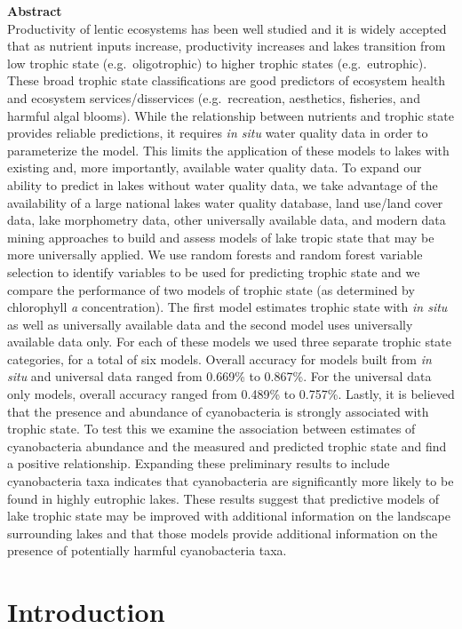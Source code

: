 \documentclass[11pt,]{article}
\begin{document}
\textbf{Abstract}\\Productivity of lentic ecosystems has been well
studied and it is widely accepted that as nutrient inputs increase,
productivity increases and lakes transition from low trophic state
(e.g.~oligotrophic) to higher trophic states (e.g.~eutrophic). These
broad trophic state classifications are good predictors of ecosystem
health and ecosystem services/disservices (e.g.~recreation, aesthetics,
fisheries, and harmful algal blooms). While the relationship between
nutrients and trophic state provides reliable predictions, it requires
\emph{in situ} water quality data in order to parameterize the model.
This limits the application of these models to lakes with existing and,
more importantly, available water quality data. To expand our ability to
predict in lakes without water quality data, we take advantage of the
availability of a large national lakes water quality database, land
use/land cover data, lake morphometry data, other universally available
data, and modern data mining approaches to build and assess models of
lake tropic state that may be more universally applied. We use random
forests and random forest variable selection to identify variables to be
used for predicting trophic state and we compare the performance of two
models of trophic state (as determined by chlorophyll \emph{a}
concentration). The first model estimates trophic state with \emph{in
situ} as well as universally available data and the second model uses
universally available data only. For each of these models we used three
separate trophic state categories, for a total of six models. Overall
accuracy for models built from \emph{in situ} and universal data ranged
from 0.669\% to 0.867\%. For the universal data only models, overall
accuracy ranged from 0.489\% to 0.757\%. Lastly, it is believed that the
presence and abundance of cyanobacteria is strongly associated with
trophic state. To test this we examine the association between estimates
of cyanobacteria abundance and the measured and predicted trophic state
and find a positive relationship. Expanding these preliminary results to
include cyanobacteria taxa indicates that cyanobacteria are
significantly more likely to be found in highly eutrophic lakes. These
results suggest that predictive models of lake trophic state may be
improved with additional information on the landscape surrounding lakes
and that those models provide additional information on the presence of
potentially harmful cyanobacteria taxa.

\section{Introduction}\label{introduction}
\end{document}
